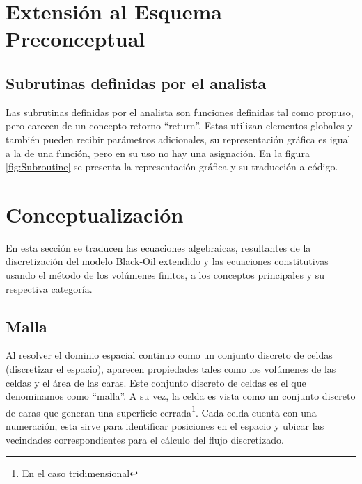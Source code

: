 \section{Extensión al Esquema Preconceptual}\label{sec:PSNew}
\subsection{Subrutinas definidas por el analista}\label{sec:PS_ADS}
Las subrutinas definidas por el analista son funciones definidas tal como \cite{JCalle} propuso, pero carecen de un concepto retorno ``return''. Estas utilizan elementos globales y también pueden recibir parámetros adicionales, su representación gráfica es igual a la de una función, pero en su uso no hay una asignación. En la figura \ref{fig:Subroutine} se presenta la representación gráfica y su traducción a código. %

\section{Conceptualización}\label{sec:Concepts}
En esta sección se traducen las ecuaciones algebraicas, resultantes de la discretización del modelo Black-Oil extendido y las ecuaciones constitutivas usando el método de los volúmenes finitos, a los conceptos principales y su respectiva categoría. 

\subsection{Malla}
Al resolver el dominio espacial continuo como un conjunto discreto de celdas (discretizar el espacio), aparecen propiedades tales como los volúmenes de las celdas y el área de las caras. Este conjunto discreto de celdas es el que denominamos como ``malla''. A su vez, la celda es vista como un conjunto discreto de caras que generan una superficie cerrada\footnote{En el caso tridimensional}. Cada celda cuenta con una numeración, esta sirve para identificar posiciones en el espacio y ubicar las vecindades correspondientes para el cálculo del flujo discretizado.


